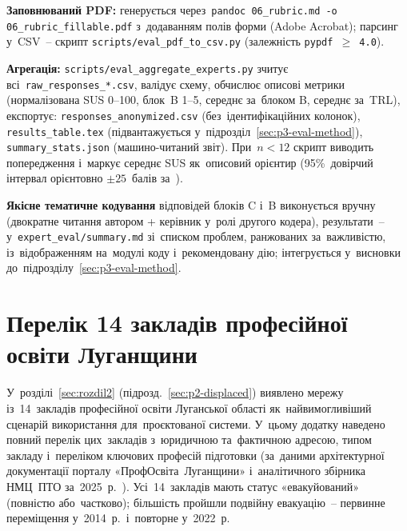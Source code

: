 \textbf{Заповнюваний PDF:} генерується через~\texttt{pandoc 06\_rubric.md -o 06\_rubric\_fillable.pdf} з~додаванням полів форми (Adobe Acrobat); парсинг у~CSV~-- скрипт \texttt{scripts/eval\_pdf\_to\_csv.py} (залежність \texttt{pypdf~$\geq$~4.0}).

\textbf{Агрегація:} \texttt{scripts/eval\_aggregate\_experts.py} зчитує всі~\texttt{raw\_responses\_*.csv}, валідує схему, обчислює описові метрики (нормалізована SUS 0--100, блок~B 1--5, середнє за~блоком B, середнє за~TRL), експортує: \texttt{responses\_anonymized.csv} (без~ідентифікаційних колонок), \texttt{results\_table.tex} (підвантажується у~підрозділ~\ref{sec:p3-eval-method}), \texttt{summary\_stats.json} (машино-читаний звіт). При~$n{<}12$ скрипт виводить попередження і~маркує середнє SUS як~описовий орієнтир (95\%~довірчий інтервал орієнтовно $\pm 25$~балів за~\cite{SauroLewis2016}).

\textbf{Якісне тематичне кодування} відповідей блоків C і~B виконується вручну (двократне читання автором + керівник у~ролі другого кодера), результати~-- у~\texttt{expert\_eval/summary.md} зі~списком проблем, ранжованих за~важливістю, із~відображенням на~модулі коду і~рекомендовану дію; інтегрується у~висновки до~підрозділу~\ref{sec:p3-eval-method}.

\clearpage
\section{Перелік 14 закладів професійної освіти Луганщини}
\label{app:institutions-list}

У~розділі~\ref{sec:rozdil2} (підрозд.~\ref{sec:p2-displaced}) виявлено мережу із~14~закладів професійної освіти Луганської області як~найвимогливіший сценарій використання для~проєктованої системи. У~цьому додатку наведено повний перелік цих~закладів з~юридичною та~фактичною адресою, типом закладу і~переліком ключових професій підготовки (за~даними архітектурної документації порталу «ПрофОсвіта~Луганщини» і~аналітичного збірника НМЦ~ПТО за~2025~р.~\cite{NMTsPTO2025}). Усі~14~закладів мають статус «евакуйований» (повністю або~частково); більшість пройшли подвійну евакуацію~-- первинне переміщення у~2014~р.\ і~повторне у~2022~р.

